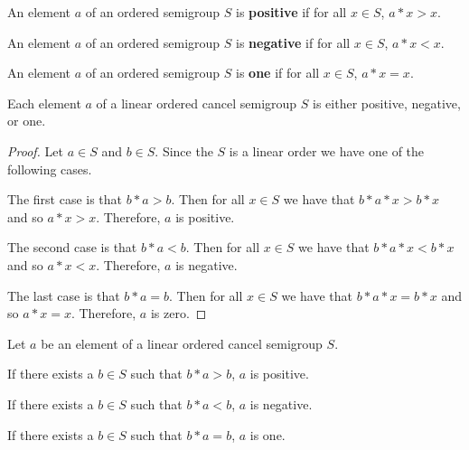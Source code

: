 \begin{definition}\label{def:positive}\leanok
{}
An element $a$ of an ordered semigroup $S$ is \textbf{positive} if for all $x\in S$, $a*x > x$.
\end{definition}

\begin{definition}\label{def:negative}\leanok
{}
An element $a$ of an ordered semigroup $S$
is \textbf{negative} if for all $x\in S$, $a*x < x$.
\end{definition}

\begin{definition}\label{def:one}\leanok
{}
An element $a$ of an ordered semigroup $S$
is \textbf{one} if for all $x\in S$, $a*x = x$.
\end{definition}

\begin{theorem}\label{thm:pos_neg_or_one}\leanok
{}
Each element $a$ of a linear ordered cancel semigroup $S$ is either positive, negative, or one.
\end{theorem}
\begin{proof}
Let $a\in S$ and $b\in S$. Since the $S$ is a linear order we have one of the following cases.

The first case is that $b * a > b$. Then for all $x\in S$ we have that $b * a * x > b * x$
and so $a * x > x$. Therefore, $a$ is positive.

The second case is that $b * a < b$. Then for all $x\in S$ we have that $b * a * x < b * x$
and so $a * x < x$. Therefore, $a$ is negative.

The last case is that $b * a = b$. Then for all $x\in S$ we have that $b * a * x = b * x$
and so $a * x = x$. Therefore, $a$ is zero.
\end{proof}

\begin{corollary}\label{lem:right_forall}\leanok
{}
Let $a$ be an element of a linear ordered cancel semigroup $S$. 

If there exists a $b\in S$ such that $b * a > b$, $a$ is positive.

If there exists a $b\in S$ such that $b * a < b$, $a$ is negative.

If there exists a $b\in S$ such that $b * a = b$, $a$ is one.
\end{corollary}

